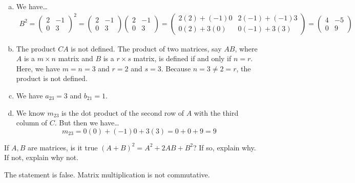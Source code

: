 \documentclass[11pt,letterpaper]{article}
\begin{document}
\sol 
\begin{enumerate}[(a)]
\item We have\dots
	\[
	\begin{aligned}
	B^2= \begin{pmatrix} 2 & -1 \\ 0 & 3 \end{pmatrix}^2= \begin{pmatrix} 2 & -1 \\ 0 & 3 \end{pmatrix} \begin{pmatrix} 2 & -1 \\ 0 & 3 \end{pmatrix}= \begin{pmatrix} 2(2) + (-1)0 & 2(-1) + (-1)3 \\ 0(2) + 3(0) & 0(-1) + 3(3) \end{pmatrix}= \begin{pmatrix} 4 & -5 \\ 0 & 9 \end{pmatrix}
	\end{aligned}
	\]

\item The product $CA$ is not defined. The product of two matrices, say $AB$, where $A$ is a $m \times n$ matrix and $B$ is a $r \times s$ matrix, is defined if and only if $n= r$. Here, we have $m= n= 3$ and $r= 2$ and $s= 3$. Because $n= 3 \neq 2= r$, the product is not defined. 

\item We have $a_{23}= 3$ and $b_{21}= 1$. 

\item We know $m_{23}$ is the dot product of the second row of $A$ with the third column of $C$. But then we have\dots
	\[
	m_{23}= 0(0) + (-1)0 + 3(3)= 0 + 0 + 9= 9
	\]
\end{enumerate}



\newpage



 If $A, B$ are matrices, is it true $(A + B)^2= A^2 + 2AB + B^2$? If so, explain why. If not, explain why not. \pspace

\sol The statement is false. Matrix multiplication is not commutative. 
\end{document}
